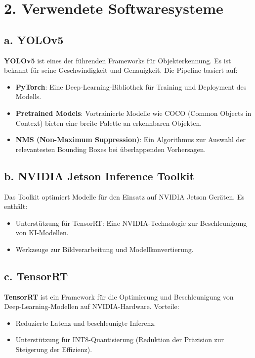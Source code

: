 \documentclass{article}
\begin{document}
\section*{2. Verwendete Softwaresysteme}

\subsection*{a. YOLOv5}
\textbf{YOLOv5} ist eines der führenden Frameworks für Objekterkennung. Es ist bekannt für seine Geschwindigkeit und Genauigkeit. Die Pipeline basiert auf:
\begin{itemize}
    \item \textbf{PyTorch}: Eine Deep-Learning-Bibliothek für Training und Deployment des Modells.
    \item \textbf{Pretrained Models}: Vortrainierte Modelle wie COCO (Common Objects in Context) bieten eine breite Palette an erkennbaren Objekten.
    \item \textbf{NMS (Non-Maximum Suppression)}: Ein Algorithmus zur Auswahl der relevantesten Bounding Boxes bei überlappenden Vorhersagen.
\end{itemize}

\subsection*{b. NVIDIA Jetson Inference Toolkit}
Das Toolkit optimiert Modelle für den Einsatz auf NVIDIA Jetson Geräten. Es enthält:
\begin{itemize}
    \item Unterstützung für TensorRT: Eine NVIDIA-Technologie zur Beschleunigung von KI-Modellen.
    \item Werkzeuge zur Bildverarbeitung und Modellkonvertierung.
\end{itemize}

\subsection*{c. TensorRT}
\textbf{TensorRT} ist ein Framework für die Optimierung und Beschleunigung von Deep-Learning-Modellen auf NVIDIA-Hardware. Vorteile:
\begin{itemize}
    \item Reduzierte Latenz und beschleunigte Inferenz.
    \item Unterstützung für INT8-Quantisierung (Reduktion der Präzision zur Steigerung der Effizienz).
\end{itemize}
\end{document}
